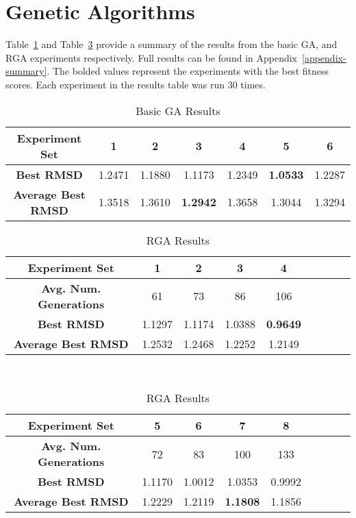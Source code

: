 \section{Genetic Algorithms}
\label{sec:ga-analysis}

Table~\ref{table:basic-ga-results} and Table~\ref{table:rga-results} provide a summary of the results from the basic GA, and RGA experiments respectively. Full results can be found in Appendix~\ref{appendix-summary}. The bolded values represent the experiments with the best fitness scores. Each experiment in the results table was run 30 times.

\begin{table}
	\centering
	\begin{tabular}{ | >{\bfseries}c | c | c | c | c | c | c | }
		\hline
		Experiment Set & 1 & 2 & 3 & 4 & 5 & 6 \\ \hline
		Best RMSD & 1.2471 & 1.1880 & 1.1173 & 1.2349 & \textbf{1.0533} & 1.2287 \\ \hline
		Average Best RMSD & 1.3518 & 1.3610 & \textbf{1.2942} & 1.3658 & 1.3044 & 1.3294 \\ \hline
	\end{tabular}
	\caption{Basic GA Results}
	\label{table:basic-ga-results}
\end{table}

\begin{table}
	\centering
	\begin{tabular}{ | >{\bfseries}c | c | c | c | c | c | c | c | c | }
		\hline
		Experiment Set & 1 & 2 & 3 & 4 \\ \hline
		Avg. Num. Generations & 61 & 73 & 86 & 106 \\ \hline
		Best RMSD & 1.1297 & 1.1174 & 1.0388 & \textbf{0.9649} \\ \hline
		Average Best RMSD & 1.2532 & 1.2468 & 1.2252 & 1.2149 \\ \hline
	\end{tabular}
	\\
	\vspace{3 mm}
	\begin{tabular}{ | >{\bfseries}c | c | c | c | c | c | c | c | c | }
		\hline
		Experiment Set & 5 & 6 & 7 & 8 \\ \hline
		Avg. Num. Generations & 72 & 83 & 100 & 133 \\ \hline
		Best RMSD & 1.1170 & 1.0012 & 1.0353 & 0.9992 \\ \hline
		Average Best RMSD & 1.2229 & 1.2119 & \textbf{1.1808} & 1.1856 \\ \hline
	\end{tabular}
	\caption{RGA Results}
	\label{table:rga-results}
\end{table}

